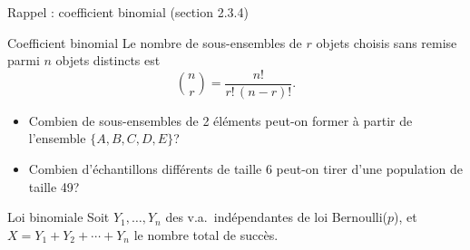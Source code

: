 \documentclass{BeamerTemplate}
\begin{document}
\begin{frame}[t]{Rappel : coefficient binomial (section 2.3.4)}
  \begin{Boite}{Coefficient binomial}
    Le nombre de sous-ensembles de $r$ objets choisis sans remise parmi $n$
    objets distincts est
    \[ \binom{n}{r} = \frac{n!}{r!\,(n-r)!}. \]
  \end{Boite}

  \begin{itemize}\itemsep 1.6cm
    \item Combien de sous-ensembles de 2 éléments peut-on former à partir de
      l'ensemble $\{A, B, C, D, E\}$?
    \item Combien d'échantillons différents de taille 6 peut-on tirer d'une
      population de taille 49?
  \end{itemize}
\end{frame}

\begin{frame}[t]{Loi binomiale}
  Soit $Y_1, \ldots, Y_n$ des v.a.\ \alert{indépendantes} de loi
  Bernoulli($p$), et $X = Y_1 + Y_2 + \cdots + Y_n$ le nombre total de succès.
  \medskip

\end{frame}
\end{document}
